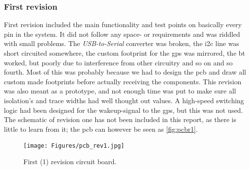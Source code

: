 \subsubsection{First revision}
First revision included the main functionality and test points on basically every pin in the system. It did not follow any space- or requirements and was riddled with small problems. The \emph{USB-to-Serial} converter was broken, the \gls{i2c} line was short circuited somewhere, the custom footprint for the \gls{gps} was mirrored, the \gls{bt} worked, but poorly due to interference from other circuitry and so on and so fourth. Most of this was probably because we had to design the \gls{pcb} and draw all custom made footprints before actually receiving the components. This revision was also meant as a prototype, and not enough time was put to make sure all isolation's and trace widths had well thought out values. A high-speed switching logic had been designed for the wakeup-signal to the \gls{gps}, but this was not used. The schematic of revision one has not been included in this report, as there is little to learn from it; the \gls{pcb} can however be seen as \autoref{fig:pcbr1}.
\begin{figure}[H]
	\centering
    \texttt{[image: Figures/pcb\_rev1.jpg]}
	\caption{First (1) revision circuit board.}
	\label{fig:pcbr1}
\end{figure}

